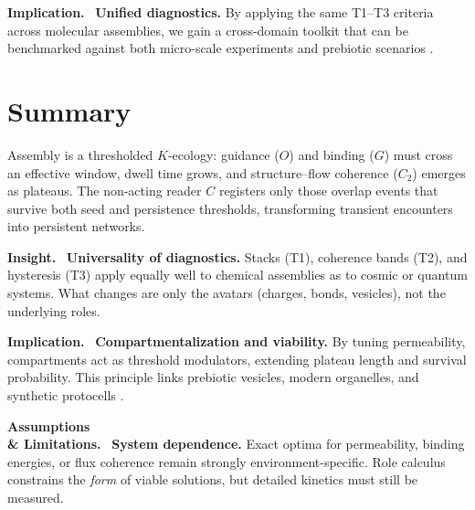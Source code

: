 \documentclass[12pt,a4paper,oneside]{scrreprt}
\newenvironment{insight}{\par\vspace{0.5em}\noindent\textbf{Insight.}\ }{\par\vspace{0.5em}}
\newenvironment{implication}{\par\vspace{0.5em}\noindent\textbf{Implication.}\ }{\par\vspace{0.5em}}
\newenvironment{limitation}{\par\vspace{0.5em}\noindent\textbf{Assumptions \\ \& Limitations.}\ }{\par\vspace{0.5em}}
\begin{document}
\begin{implication}
\textbf{Unified diagnostics.} 
By applying the same T1--T3 criteria across molecular assemblies, 
we gain a cross-domain toolkit that can be benchmarked against 
both micro-scale experiments and prebiotic scenarios 
\citep{Hargreaves2012PrebioticVesicles,Chong2014Microfluidics}.
\end{implication}

\section*{Summary}

Assembly is a thresholded $K$-ecology: 
guidance ($O$) and binding ($G$) must cross an effective window, 
dwell time grows, and structure--flow coherence ($C_2$) 
emerges as plateaus. 
The non-acting reader $C$ registers only those overlap events 
that survive both seed and persistence thresholds, 
transforming transient encounters into persistent networks. 

\begin{insight}
\textbf{Universality of diagnostics.} 
Stacks (T1), coherence bands (T2), and hysteresis (T3) 
apply equally well to chemical assemblies as to 
cosmic or quantum systems. 
What changes are only the avatars (charges, bonds, vesicles), 
not the underlying roles. 
\end{insight}

\begin{implication}
\textbf{Compartmentalization and viability.} 
By tuning permeability, compartments act as threshold modulators, 
extending plateau length and survival probability. 
This principle links prebiotic vesicles, modern organelles, 
and synthetic protocells \citep{Szostak2001Protocells,Luisi2006OriginLife}. 
\end{implication}

\begin{limitation}
\textbf{System dependence.} 
Exact optima for permeability, binding energies, or flux coherence 
remain strongly environment-specific. 
Role calculus constrains the \emph{form} of viable solutions, 
but detailed kinetics must still be measured. 
\end{limitation}
\end{document}

